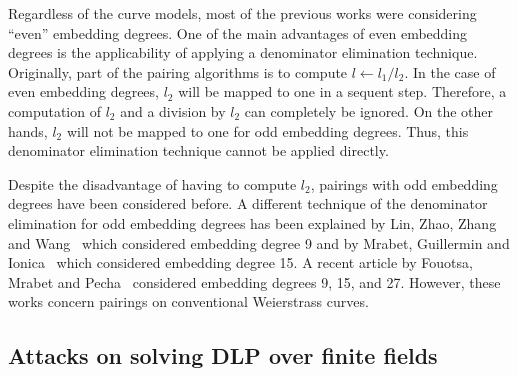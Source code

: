 Regardless of the curve models, most of the previous works were considering ``even'' embedding degrees.
One of the main advantages of even embedding degrees is the applicability of applying a denominator elimination technique.
Originally, part of the pairing algorithms is to compute $l \leftarrow l_1/l_2$.
In the case of even embedding degrees, $l_2$ will be mapped to one in a sequent step.
Therefore, a computation of $l_2$ and a division by $l_2$ can completely be ignored.
On the other hands, $l_2$ will not be mapped to one for odd embedding degrees.
Thus, this denominator elimination technique cannot be applied directly.

Despite the disadvantage of having to compute $l_2$,
pairings with odd embedding degrees have been considered before.
A different technique of the denominator elimination for odd embedding degrees has been explained by
Lin, Zhao, Zhang and Wang~\cite{2008/lin} which considered embedding degree 9 and by
Mrabet, Guillermin and Ionica~\cite{2009/deg15} which considered embedding degree 15.
A recent article by Fouotsa, Mrabet and Pecha~\cite{2016/degodd} considered embedding degrees 9, 15, and 27.
However, these works concern pairings on conventional Weierstrass curves.

\subsection{Attacks on solving DLP over finite fields}

